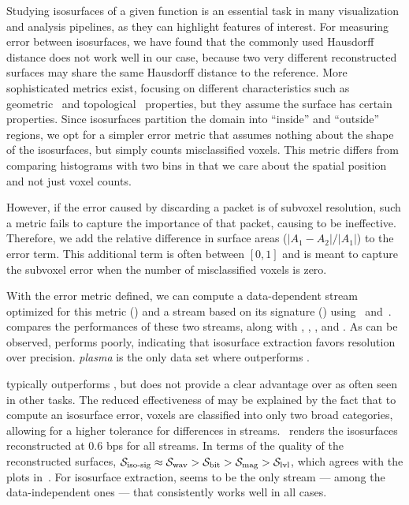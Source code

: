 Studying isosurfaces of a given function is an essential task in many visualization and analysis
pipelines, as they can highlight features of interest. For measuring error between isosurfaces, we
have found that the commonly used Hausdorff distance does not work well in our case, because two
very different reconstructed surfaces may share the same Hausdorff distance to the reference. More
sophisticated metrics exist, focusing on different characteristics such as
geometric~\cite{verifiable-isosurface} and topological~\cite{topology-verification-isosurface}
properties, but they assume the surface has certain properties. Since isosurfaces partition the
domain into ``inside'' and ``outside'' regions, we opt for a simpler error metric that assumes
nothing about the shape of the isosurfaces, but simply counts misclassified voxels. This metric
differs from comparing histograms with two bins in that we care about the spatial position and not
just voxel counts.

However, if the error caused by discarding a packet is of subvoxel resolution, such a metric fails
to capture the importance of that packet, causing \siop to be ineffective. Therefore, we add the
relative difference in surface areas ($|A_1-A_2|/|A_1|$) to the error term. This additional term is
often between $[0, 1]$ and is meant to capture the subvoxel error when the number of misclassified
voxels is zero.

With the error metric defined, we can compute a data-dependent stream optimized for this metric
(\siop) and a stream based on its signature (\sisg) using~
and~.  compares the performances of these two
streams, along with \sbit, \slvl, \swav, and \smag. As can be observed, \slvl performs poorly,
indicating that isosurface extraction favors resolution over precision. \emph{plasma} is the only
data set where \sbit outperforms \swav.

\swav typically outperforms \sbit, but \sisg does not provide a clear advantage over \swav as often
seen in other tasks. The reduced effectiveness of \sisg may be explained by the fact that to compute
an isosurface error, voxels are classified into only two broad categories, allowing for a higher
tolerance for differences in streams.~ renders the
isosurfaces reconstructed at 0.6 bps for all streams. In terms of the quality of the reconstructed
surfaces, $\sisg \approx \swav > \sbit > \smag > \slvl$, which agrees with the plots
in~. For isosurface extraction, \swav seems to be the only stream ---
among the data-independent ones --- that consistently works well in all cases.
